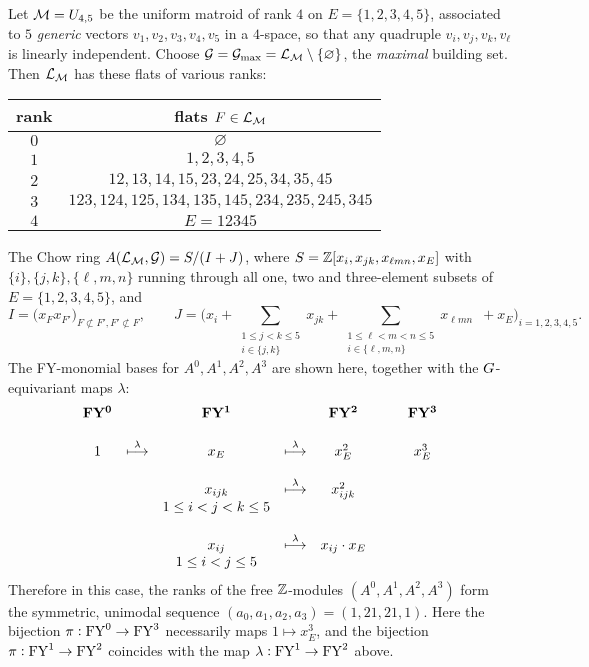 \begin{example} 
        Let $\mathcal{M}=U_{4,5}$ be the uniform matroid of rank $4$ on $E=\{1,2,3,4,5\}$, associated to $5$ {\it generic} vectors $v_1,v_2,v_3,v_4,v_5$ in a $4$-space, so that any quadruple $v_i,v_j,v_k,v_\ell$ is linearly independent.  Choose $\mathcal{G}=\mathcal{G}_{\max}=\mathcal{L}_{\mathcal{M}}\setminus\{\varnothing\}$, the \emph{maximal} building set.
        Then $\mathcal{L}_{\mathcal{M}}$ has these flats of various ranks:

\begin{center}
\begin{tabular}{|c|c|}\hline
rank & flats $F \in \mathcal{L}_{\mathcal{M}}$ \\ \hline\hline
 $0$ & $\varnothing$ \\ \hline
 $1$ & $1,2,3,4,5$ \\ \hline
 $2$ & $12,13,14,15,23,24,25,34,35,45$ \\ \hline
 $3$ & $123,124,125,134,135,145,234,235,245,345$ \\ \hline
 $4$ & $E=12345$ \\ \hline
\end{tabular}
\end{center}
The Chow ring $A(\mathcal{L}_{\mathcal{M}}, \mathcal{G})=S/(I+J)$, where 
$
S= \mathbb{Z}[ x_i, x_{jk}, x_{\ell m n}, x_E]
$
with
$\{i\}, \{j,k\}, \{\ell, m, n\}$ running through all one, two and three-element subsets of 
$E=\{1,2,3,4,5\}$,
and 
$$
I=\Big( x_F x_{F'} \Big)_{F \not\subset F', F' \not \subset F},
\qquad
J=\bigg( x_i 
+ \sum_{\substack{1 \leq j < k \leq 5\\i \in \{j,k\}}} x_{jk}
+ \sum_{\substack{1 \leq \ell  < m < n \leq 5\\i \in \{\ell,m,n\} }} x_{\ell m n}
\,\,\, + x_E \bigg)_{i=1,2,3,4,5}.
$$
The FY-monomial bases for $A^0,A^1,A^2,A^3$ are shown here,
together with the $G$-equivariant maps $\lambda$:
$$
\begin{array}{cccccccc}
\bf{FY^0} & & \bf{FY^1}& & \bf{FY^2} & & &\bf{FY^3} \\
 & & & & & & & \\
1 &\overset{\lambda}{\longmapsto}& x_E &\overset{\lambda}{\longmapsto} & x_E^2 &  & &x_E^3 \\
 & & & & & & &\\
  & & x_{ijk} &\overset{\lambda}{\longmapsto} & x_{ijk}^2& & &\\
      & &  1 \leq i<j<k \leq 5 & & & & & \\
       & & & & & & &\\
  & &x_{ij} &\overset{\lambda}{\longmapsto} &x_{ij} \cdot x_E& & &\\
   & & 1 \leq i<j \leq 5& & & &  &\\
\end{array} 
$$
Therefore in this case, the ranks of the free $\mathbb{Z}$-modules $(A^0,A^1,A^2,A^3)$ form the symmetric, unimodal sequence $(a_0,a_1,a_2,a_3)=(1,21,21,1)$. 
Here the bijection $\pi: \mathrm{FY}^0 \rightarrow \mathrm{FY}^3$ 
necessarily maps $1 \longmapsto x_E^3$, and 
the bijection $\pi: \mathrm{FY}^1 \rightarrow \mathrm{FY}^2$  coincides with
the map $\lambda: \mathrm{FY}^1 \rightarrow \mathrm{FY}^2$ above.  
\end{example}

